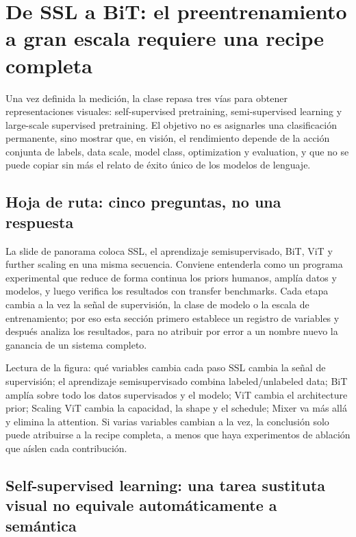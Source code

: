 \section{De SSL a BiT: el preentrenamiento a gran escala requiere una recipe completa}

Una vez definida la medición, la clase repasa tres vías para obtener representaciones visuales: self-supervised pretraining, semi-supervised learning y large-scale supervised pretraining. El objetivo no es asignarles una clasificación permanente, sino mostrar que, en visión, el rendimiento depende de la acción conjunta de labels, data scale, model class, optimization y evaluation, y que no se puede copiar sin más el relato de éxito único de los modelos de lenguaje.

\subsection{Hoja de ruta: cinco preguntas, no una respuesta}

La slide de panorama coloca SSL, el aprendizaje semisupervisado, BiT, ViT y further scaling en una misma secuencia. Conviene entenderla como un programa experimental que reduce de forma continua los priors humanos, amplía datos y modelos, y luego verifica los resultados con transfer benchmarks. Cada etapa cambia a la vez la señal de supervisión, la clase de modelo o la escala de entrenamiento; por eso esta sección primero establece un registro de variables y después analiza los resultados, para no atribuir por error a un nombre nuevo la ganancia de un sistema completo.


\begin{knowledgebox}{Lectura de la figura: qué variables cambia cada paso}
SSL cambia la señal de supervisión; el aprendizaje semisupervisado combina labeled/unlabeled data; BiT amplía sobre todo los datos supervisados y el modelo; ViT cambia el architecture prior; Scaling ViT cambia la capacidad, la shape y el schedule; Mixer va más allá y elimina la attention. Si varias variables cambian a la vez, la conclusión solo puede atribuirse a la recipe completa, a menos que haya experimentos de ablación que aíslen cada contribución.
\end{knowledgebox}

\subsection{Self-supervised learning: una tarea sustituta visual no equivale automáticamente a semántica}

